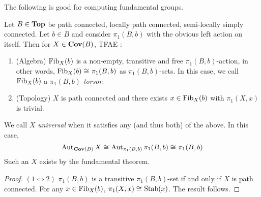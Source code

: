 \documentclass[./main.tex]{subfiles}
\begin{document}
\begin{rmk}
  The following is good for computing fundamental groups.
\end{rmk}

\begin{prop}
  
  Let $B \in \mathbf{Top}$ be path connected, locally path connected,
  semi-locally simply connected.
  Let $b \in B$ and consider $\pi_1(B,b)$ with 
  the obvious left action on itself. 
  Then for $X \in \mathbf{Cov}(B)$, TFAE : 
  \begin{enumerate}
    \item (Algebra) 
    $\operatorname{Fib}_X(b)$ is a non-empty, transitive and free $\pi_1(B,b)$-action,
    in other words, $\operatorname{Fib}_X(b) \cong_{} \pi_1(B,b)$ as $\pi_1(B,b)$-sets.
    In this case, we call $\operatorname{Fib}_X(b)$ a \emph{$\pi_1(B,b)$-torsor}.
    \item (Topology) $X$ is path connected and 
    there exists $x \in \operatorname{Fib}_X(b)$ with $\pi_1(X,x)$ is trivial. 
  \end{enumerate}
  We call $X$ \emph{universal} when it satisfies any 
  (and thus both) of the above.
  In this case, \[
    \operatorname{Aut}_{\mathbf{Cov}(B)} X \cong_{} \operatorname{Aut}_{\pi_1(B,b)} \pi_1(B,b)
    \cong_{} \pi_1(B,b)
  \]
  Such an $X$ exists by the fundamental theorem.
  
\end{prop}
\begin{proof}
  
  \textit{$(1 \iff 2)$}
  $\pi_1(B,b)$ is a transitive $\pi_1(B,b)$-set 
  if and only if $X$ is path connected.
  For any $x \in \operatorname{Fib}_X(b)$,
  $\pi_1(X,x) \cong_{} \operatorname{Stab}(x)$.
  The result follows.

\end{proof}
\end{document}
